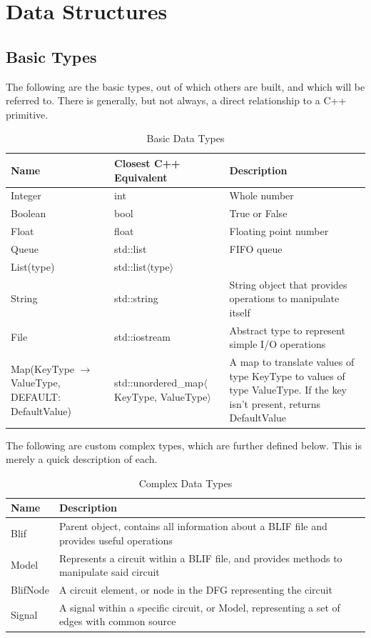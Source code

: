 \documentclass[12pt,final,oneside]{dwThesis} %
\begin{document}
   \section{Data Structures}\label{secDatastructures} \subsection{Basic Types}
   The following are the basic types, out of which others are built, and which
   will be referred to. There is generally, but not always, a direct
   relationship to a C++ primitive.  \begin{table}
      \begin{tabularx}{\linewidth}{XXX} \toprule Name & Closest C++ Equivalent
         & Description\\ \midrule Integer &  int & Whole number \\ Boolean &
         bool & True or False \\ Float & float & Floating point number \\ Queue
         & std::list & FIFO queue \\ List(type) &
         std::list$\langle$type$\rangle$ & \\ String & std::string & String
         object that provides operations to manipulate itself \\ File &
         std::iostream & Abstract type to represent simple I/O operations \\
         Map(KeyType $\to$ ValueType, DEFAULT:  DefaultValue) &
         std::unordered\_map$\langle$KeyType, ValueType$\rangle$ &  A map to
         translate values of type KeyType to values of type ValueType. If the
         key isn't present, returns DefaultValue \\ \bottomrule \end{tabularx}
      \caption{Basic Data Types} \end{table} The following are custom complex
   types, which are further defined below. This is merely a quick description
   of each.  \begin{table} \begin{tabularx}{\linewidth}{lX} \toprule Name &
         Description\\ \midrule Blif & Parent object, contains all information
         about a \gls{BLIF} file and provides useful operations \\ Model &
         Represents a circuit within a \gls{BLIF} file, and provides methods to
         manipulate said circuit \\ BlifNode & A circuit element, or node in
         the \gls{DFG} representing the circuit \\ Signal & A signal within a
         specific circuit, or Model, representing a set of edges with common
         source \\ \bottomrule \end{tabularx} \caption{Complex Data Types}
   \end{table}
\end{document}
